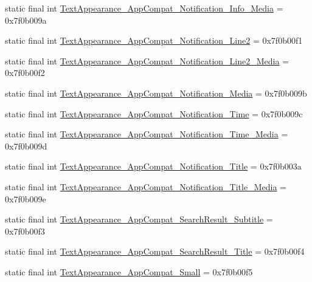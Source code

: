 \begin{CompactItemize}
static final int \hyperlink{classandroid_1_1support_1_1v7_1_1recyclerview_1_1_r_1_1style_dd511c6b9ad6748a9b7467583d931fa9}{TextAppearance\_\-AppCompat\_\-Notification\_\-Info\_\-Media} = 0x7f0b009a
\item 
static final int \hyperlink{classandroid_1_1support_1_1v7_1_1recyclerview_1_1_r_1_1style_240be70e77978b9a85e0fc540fc310b2}{TextAppearance\_\-AppCompat\_\-Notification\_\-Line2} = 0x7f0b00f1
\item 
static final int \hyperlink{classandroid_1_1support_1_1v7_1_1recyclerview_1_1_r_1_1style_16127efb05f34787a76a26be23f8c79b}{TextAppearance\_\-AppCompat\_\-Notification\_\-Line2\_\-Media} = 0x7f0b00f2
\item 
static final int \hyperlink{classandroid_1_1support_1_1v7_1_1recyclerview_1_1_r_1_1style_b1f3ba718d3cdb45b5d2506fe5ca2a07}{TextAppearance\_\-AppCompat\_\-Notification\_\-Media} = 0x7f0b009b
\item 
static final int \hyperlink{classandroid_1_1support_1_1v7_1_1recyclerview_1_1_r_1_1style_bfc73dcdd82790da1e05182e59138dcd}{TextAppearance\_\-AppCompat\_\-Notification\_\-Time} = 0x7f0b009c
\item 
static final int \hyperlink{classandroid_1_1support_1_1v7_1_1recyclerview_1_1_r_1_1style_3e2021e71f6984db47090f1275c96b35}{TextAppearance\_\-AppCompat\_\-Notification\_\-Time\_\-Media} = 0x7f0b009d
\item 
static final int \hyperlink{classandroid_1_1support_1_1v7_1_1recyclerview_1_1_r_1_1style_8ad116324b6c685013ae80ea21f24f0c}{TextAppearance\_\-AppCompat\_\-Notification\_\-Title} = 0x7f0b003a
\item 
static final int \hyperlink{classandroid_1_1support_1_1v7_1_1recyclerview_1_1_r_1_1style_a5ab5ce3464c8f1ef00cfd64c0e8759f}{TextAppearance\_\-AppCompat\_\-Notification\_\-Title\_\-Media} = 0x7f0b009e
\item 
static final int \hyperlink{classandroid_1_1support_1_1v7_1_1recyclerview_1_1_r_1_1style_f80f6becb26a7ed4000fe478eeabd212}{TextAppearance\_\-AppCompat\_\-SearchResult\_\-Subtitle} = 0x7f0b00f3
\item 
static final int \hyperlink{classandroid_1_1support_1_1v7_1_1recyclerview_1_1_r_1_1style_aefb8fbc55f9aa6a5a430e54d5a17aa7}{TextAppearance\_\-AppCompat\_\-SearchResult\_\-Title} = 0x7f0b00f4
\item 
static final int \hyperlink{classandroid_1_1support_1_1v7_1_1recyclerview_1_1_r_1_1style_82ff28f66ad30c85882666bc1fc07b64}{TextAppearance\_\-AppCompat\_\-Small} = 0x7f0b00f5
\item 

\end{CompactItemize}
